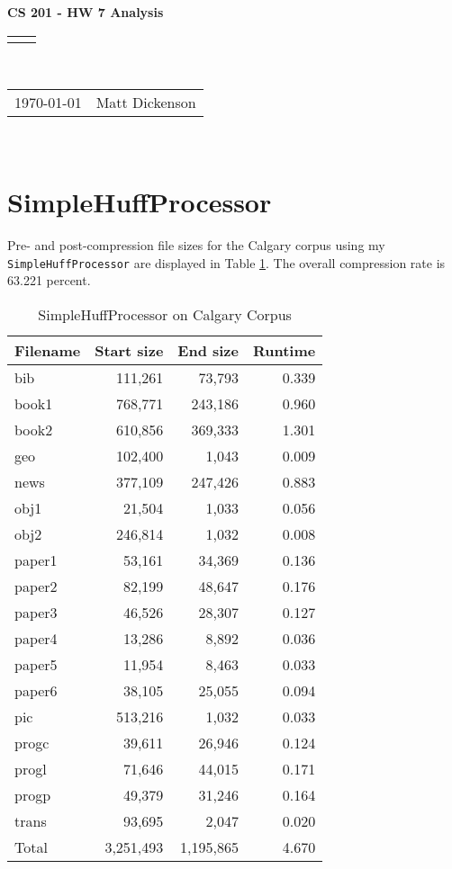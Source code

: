 \documentclass[12pt]{article}
\renewcommand{\title}[1]{\textbf{#1}\\}
\renewcommand{\line}{\begin{tabularx}{\textwidth}{X>{\raggedleft}X}\hline\\\end{tabularx}\\[-0.5cm]}
\newcommand{\leftright}[2]{\begin{tabularx}{\textwidth}{X>{\raggedleft}X}#1%
& #2\\\end{tabularx}\\[-0.5cm]}
\begin{document}
\title{CS 201 - HW 7 Analysis}
\line
\leftright{\today}{Matt Dickenson} %
\setlength{\parindent}{16pt}

\section{SimpleHuffProcessor}

Pre- and post-compression file sizes for the Calgary corpus using my \texttt{SimpleHuffProcessor} are displayed in Table \ref{simple-calgary}. The overall compression rate is 63.221 percent.

\begin{table}[h!]
\centering
\caption{SimpleHuffProcessor on Calgary Corpus}
\label{simple-calgary}
\begin{tabular}{lrrr}
\toprule
Filename & Start size & End size & Runtime \\
\midrule
bib &	 111,261 & 73,793 & 0.339 \\
book1 &	 768,771 & 243,186 & 0.960 \\
book2 &	 610,856 & 369,333 & 1.301 \\
geo &	 102,400 & 1,043 & 0.009 \\
news &	 377,109 & 247,426 & 0.883 \\
obj1 &	 21,504 & 1,033 & 0.056 \\
obj2 &	 246,814 & 1,032 & 0.008 \\
paper1 &	 53,161 & 34,369 & 0.136 \\
paper2 &	 82,199 & 48,647 & 0.176 \\
paper3 &	 46,526 & 28,307 & 0.127 \\
paper4 &	 13,286 & 8,892 & 0.036 \\
paper5 &	 11,954 & 8,463 & 0.033 \\
paper6 &	 38,105 & 25,055 & 0.094 \\
pic &	 513,216 & 1,032 & 0.033 \\
progc &	 39,611 & 26,946 & 0.124 \\
progl &	 71,646 & 44,015 & 0.171 \\
progp &	 49,379 & 31,246 & 0.164 \\
trans &	 93,695 & 2,047 & 0.020 \\
\midrule
Total & 3,251,493 & 1,195,865 & 4.670 \\
\bottomrule
\end{tabular}
\end{table}
\end{document}
